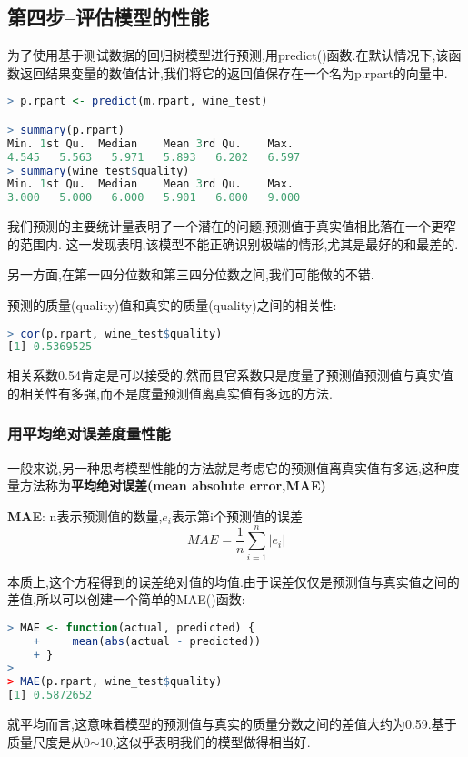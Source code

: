 \documentclass[11pt,a4paper,oneside]{book}
\begin{document}
\subsection{第四步--评估模型的性能}
为了使用基于测试数据的回归树模型进行预测,用predict()函数.在默认情况下,该函数返回结果变量的数值估计,我们将它的返回值保存在一个名为p.rpart的向量中.
\begin{lstlisting}[language=r]
> p.rpart <- predict(m.rpart, wine_test)

> summary(p.rpart)
Min. 1st Qu.  Median    Mean 3rd Qu.    Max. 
4.545   5.563   5.971   5.893   6.202   6.597 
> summary(wine_test$quality)
Min. 1st Qu.  Median    Mean 3rd Qu.    Max. 
3.000   5.000   6.000   5.901   6.000   9.000 
\end{lstlisting}
我们预测的主要统计量表明了一个潜在的问题,预测值于真实值相比落在一个更窄的范围内.
这一发现表明,该模型不能正确识别极端的情形,尤其是最好的和最差的.

另一方面,在第一四分位数和第三四分位数之间,我们可能做的不错.

预测的质量(quality)值和真实的质量(quality)之间的相关性:
\begin{lstlisting}[language=r]
> cor(p.rpart, wine_test$quality)
[1] 0.5369525
\end{lstlisting}
相关系数0.54肯定是可以接受的.然而县官系数只是度量了预测值预测值与真实值的相关性有多强,而不是度量预测值离真实值有多远的方法.

\subsubsection{用平均绝对误差度量性能}
一般来说,另一种思考模型性能的方法就是考虑它的预测值离真实值有多远,这种度量方法称为\textbf{平均绝对误差(mean absolute error,MAE)}
\begin{tcolorbox}[colback=blue!7!white,colframe=blue!40]
\textbf{MAE}: n表示预测值的数量,$e_i$表示第i个预测值的误差
\begin{equation}
MAE=\frac{1}{n}\sum^{n}_{i=1}|e_i|
\end{equation}
\end{tcolorbox}
本质上,这个方程得到的误差绝对值的均值.由于误差仅仅是预测值与真实值之间的差值,所以可以创建一个简单的MAE()函数:
\begin{lstlisting}[language=r]
> MAE <- function(actual, predicted) {
	+     mean(abs(actual - predicted))  
	+ }
> 
> MAE(p.rpart, wine_test$quality)
[1] 0.5872652
\end{lstlisting}
就平均而言,这意味着模型的预测值与真实的质量分数之间的差值大约为0.59.基于质量尺度是从0$\sim$10,这似乎表明我们的模型做得相当好.
\end{document}
